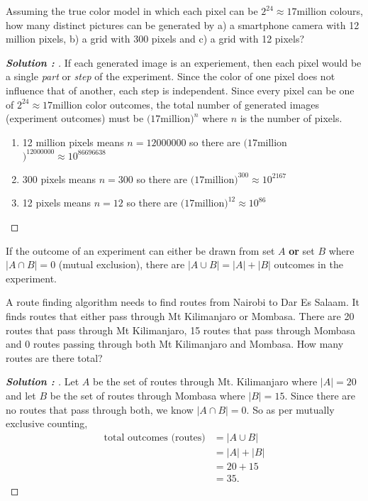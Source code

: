 \documentclass[11pt]{article}
\newenvironment{solution}[1][]{%
  \renewcommand\qedsymbol{$\blacksquare$}%
  \def\temp{\normalfont\bfseries Solution \theexample: #1}
  \begin{proof}[\temp]
  \normalfont %
}{%
  \end{proof}
}
\newcommand{\BF}{\textbf}
\begin{document}
\begin{example}
    Assuming the true color model in which each pixel can be $2^{24} \approx 17$million colours, how many distinct pictures can be generated
    by a) a smartphone camera with 12 million pixels, b) a grid with 300 pixels and c) a grid with 12 pixels?
\end{example}
\begin{solution}
    If each generated image is an experiement, then each pixel would be a single \textit{part} or \textit{step} of the experiment. Since the
    color of one pixel does not influence that of another, each step is independent. Since every pixel can be one of $2^{24} \approx 17$million
    color outcomes, the total number of generated images (experiment outcomes) must be $(17$million$)^{n}$ where $n$ is the number of pixels.
    \begin{enumerate}[label=\alph*.]
        \item 12 million pixels means $n=12000000$ so there are $(17$million$)^{12000000} \approx 10^{86696638}$ 
        \item 300 pixels means $n=300$ so there are $(17$million$)^{300} \approx 10^{2167}$
        \item 12 pixels means $n=12$ so there are $(17$million$)^{12} \approx 10^{86}$ 
    \end{enumerate}    
\end{solution}

\begin{definition}
    \label{sec:Mutually-Exclusive-Counting}
    If the outcome of an experiment can either be drawn from set $A$ \BF{or} set $B$ where $|A\cap B| = 0$ (mutual exclusion), there are
    $|A\cup B|=|A|+|B|$ outcomes in the experiment.
\end{definition}

\begin{example}
    A route finding algorithm needs to find routes from Nairobi to Dar Es Salaam. It finds routes that either pass through Mt Kilimanjaro or
    Mombasa. There are 20 routes that pass through Mt Kilimanjaro, 15 routes that pass through Mombasa and 0 routes passing through both Mt
    Kilimanjaro and Mombasa. How many routes are there total?
\end{example}
\begin{solution}
    Let $A$ be the set of routes through Mt. Kilimanjaro where $|A|=20$ and let $B$ be the set of routes through Mombasa where $|B|=15$.
    Since there are no routes that pass through both, we know $|A \cap B| = 0$. So as per mutually exclusive counting,
    \begin{align*}
        \text{total outcomes (routes)} &= |A \cup B|\\
                                       &= |A|+|B|\\
                                       &= 20+15\\
                                       &= 35.
    \end{align*} 
\end{solution}
\end{document}
